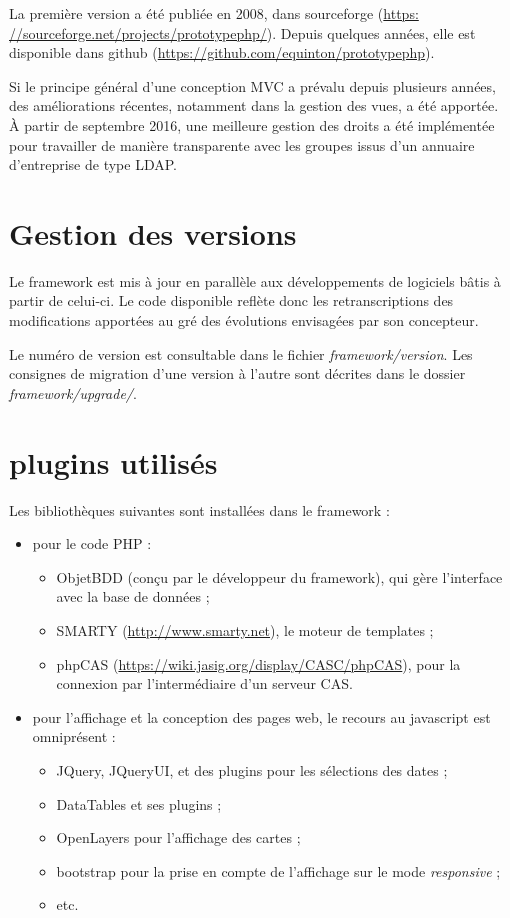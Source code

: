 La première version a été publiée en 2008, dans sourceforge (\href{https://sourceforge.net/projects/prototypephp/}{https: //sourceforge.net/projects/prototypephp/}). Depuis quelques années, elle est disponible dans github (\href{https://github.com/equinton/prototypephp}{https://github.com/equinton/prototypephp}).

Si le principe général d'une conception MVC a prévalu depuis plusieurs années, des améliorations récentes, notamment dans la gestion des vues, a été apportée. À partir de septembre 2016, une meilleure gestion des droits a été implémentée pour travailler de manière transparente avec les groupes issus d'un annuaire d'entreprise de type LDAP. 

\section{Gestion des versions}

Le framework est mis à jour en parallèle aux développements de logiciels bâtis à partir de celui-ci. Le code disponible reflète donc les retranscriptions des modifications apportées au gré des évolutions envisagées par son concepteur.

Le numéro de version est consultable dans le fichier \textit{framework/version}. Les consignes de migration d'une version à l'autre sont décrites dans le dossier \textit{framework/upgrade/}.

\section{plugins utilisés}
Les bibliothèques suivantes sont installées dans le framework :
\begin{itemize}
\item pour le code PHP :
\begin{itemize}
\item ObjetBDD (conçu par le développeur du framework), qui gère l'interface avec la base de données ;
\item SMARTY (\url{http://www.smarty.net}), le moteur de templates ;
\item phpCAS (\url{https://wiki.jasig.org/display/CASC/phpCAS}), pour la connexion par l'intermédiaire d'un serveur CAS.

\end{itemize}
\item pour l'affichage et la conception des pages web, le recours au javascript est omniprésent :
\begin{itemize}
\item JQuery, JQueryUI, et des plugins pour les sélections des dates ;
\item DataTables et ses plugins ;
\item OpenLayers pour l'affichage des cartes ;
\item bootstrap pour la prise en compte de l'affichage sur le mode \textit{responsive} ;
\item etc.

\end{itemize}
\end{itemize}

